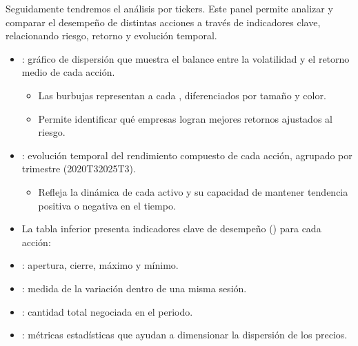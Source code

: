 \documentclass[letterpaper,10pt,spanish]{sphinxmanual}
\begin{document}
\sphinxAtStartPar
Seguidamente tendremos el análisis por tickers. Este panel permite analizar y comparar el desempeño de distintas acciones a través de indicadores clave, relacionando riesgo, retorno y evolución temporal.
\begin{itemize}
\item {} 
\sphinxAtStartPar
{}: gráfico de dispersión que muestra el balance entre la volatilidad y el retorno medio de cada acción.
\begin{itemize}
\item {} 
\sphinxAtStartPar
Las burbujas representan a cada , diferenciados por tamaño y color.

\item {} 
\sphinxAtStartPar
Permite identificar qué empresas logran mejores retornos ajustados al riesgo.

\end{itemize}

\item {} 
\sphinxAtStartPar
{}: evolución temporal del rendimiento compuesto de cada acción, agrupado por trimestre (2020T3\textendash{}2025T3).
\begin{itemize}
\item {} 
\sphinxAtStartPar
Refleja la dinámica de cada activo y su capacidad de mantener tendencia positiva o negativa en el tiempo.

\end{itemize}

\item {} 
\sphinxAtStartPar
{}
La tabla inferior presenta indicadores clave de desempeño () para cada acción:

\item {} 
\sphinxAtStartPar
{}: apertura, cierre, máximo y mínimo.

\item {} 
\sphinxAtStartPar
{}: medida de la variación dentro de una misma sesión.

\item {} 
\sphinxAtStartPar
{}: cantidad total negociada en el periodo.

\item {} 
\sphinxAtStartPar
{}: métricas estadísticas que ayudan a dimensionar la dispersión de los precios.

\end{itemize}
\end{document}
